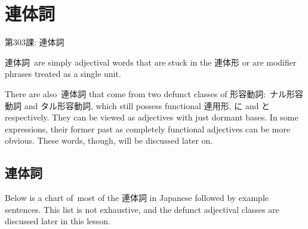     
\chapter{連体詞}

\begin{center}
\begin{Large}
第303課: 連体詞 
\end{Large}
\end{center}
 
\par{ 連体詞 are simply adjectival words that are stuck in the 連体形 or are modifier phrases treated as a single unit. }
 
\par{There are also 連体詞 that come from two defunct classes of 形容動詞: ナル形容動詞 and タル形容動詞, which still possess functional 連用形, に and と respectively. They can be viewed as adjectives with just dormant bases. In some expressions, their former past as completely functional adjectives can be more obvious. These words, though, will be discussed later on. }
      
\section{連体詞}
 
\par{  Below is a chart of most of the 連体詞 in Japanese followed by example sentences. This list is not exhaustive, and the defunct adjectival classes are discussed later in this lesson. }

